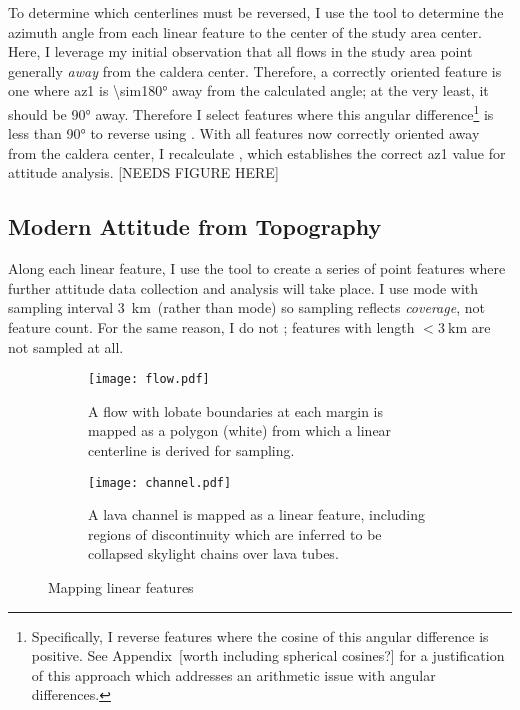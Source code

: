 To determine which centerlines must be reversed, I use the  tool to determine the azimuth angle from each linear feature to the center of the study area \acs{center}. Here, I leverage my initial observation that all flows in the study area point generally \emph{away} from the caldera center. Therefore, a correctly oriented feature is one where \acs{az1} is \ang{\sim180} away from the calculated angle; at the very least, it should be \ang{90} away. Therefore I select features where this angular difference\footnote{Specifically, I reverse features where the cosine of this angular difference is positive. See Appendix~[worth including spherical cosines?] for a justification of this approach which addresses an arithmetic issue with angular differences.} is less than \ang{90} to reverse using . With all features now correctly oriented away from the caldera center, I recalculate , which establishes the correct \ac{az1} value for attitude analysis. [NEEDS FIGURE HERE]

\subsection{Modern Attitude from Topography}

\newcommand{\samplinginterval}{\qty{3}{\km}}

Along each linear feature, I use the  tool to create a series of point features where further attitude data collection and analysis will take place. I use  mode with sampling interval \samplinginterval\ (rather than  mode) so sampling reflects \emph{coverage}, not feature count. For the same reason, I do not ; features with length $<\samplinginterval$ are not sampled at all.

\begin{figure}
    \centering
    \begin{subfigure}{\textwidth}
        \centering
        \texttt{[image: flow.pdf]}
        \caption[Mapped lava flow \& centerline]{A flow with lobate boundaries at each margin is mapped as a polygon (white) from which a linear centerline is derived for sampling.}%
        \label{fig:flow}
    \end{subfigure}
    \begin{subfigure}{\textwidth}
        \centering
        \texttt{[image: channel.pdf]}
        \caption[Mapped lava channel]{A lava channel is mapped as a linear feature, including regions of discontinuity which are inferred to be collapsed skylight chains over lava tubes.}%
        \label{fig:channel}
    \end{subfigure}
    \caption{Mapping linear features}%
    \label{fig:mapping-linear}
\end{figure}

